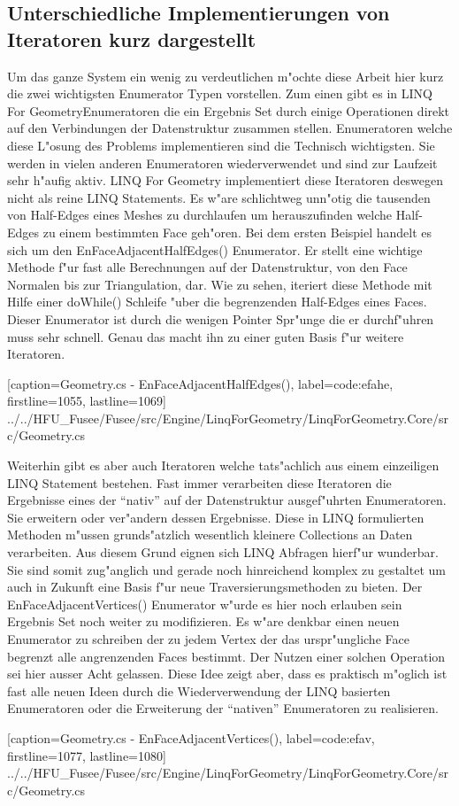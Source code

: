 \documentclass[pagesize, paper=a4, fontsize=12pt,titlepage=true, headings=small, headnosepline, abstractoff, liststotoc, nochapterprefix, plainheadsepline]{scrreprt}
\newcommand{\LFG}{LINQ For Geometry}
\newcommand{\LFGS}{LINQ For Geometry }
\begin{document}
		\subsection {Unterschiedliche Implementierungen von Iteratoren kurz dargestellt}
			Um das ganze System ein wenig zu verdeutlichen m"ochte diese Arbeit hier kurz die zwei wichtigsten Enumerator Typen vorstellen. Zum einen gibt es in \LFG Enumeratoren die ein Ergebnis Set durch einige Operationen direkt auf den Verbindungen der Datenstruktur zusammen stellen. Enumeratoren welche diese L"osung des Problems implementieren sind die Technisch wichtigsten. Sie werden in vielen anderen Enumeratoren wiederverwendet und sind zur Laufzeit sehr h"aufig aktiv. \LFGS implementiert diese Iteratoren deswegen nicht als reine LINQ Statements. Es w"are schlichtweg unn"otig die tausenden von Half-Edges eines Meshes zu durchlaufen um herauszufinden welche Half-Edges zu einem bestimmten Face geh"oren. Bei dem ersten Beispiel handelt es sich um den EnFaceAdjacentHalfEdges() Enumerator. Er stellt eine wichtige Methode f"ur fast alle Berechnungen auf der Datenstruktur, von den Face Normalen bis zur Triangulation, dar. Wie zu sehen, iteriert diese Methode mit Hilfe einer do{}While() Schleife "uber die begrenzenden Half-Edges eines Faces. Dieser Enumerator ist durch die wenigen Pointer Spr"unge die er durchf"uhren muss sehr schnell. Genau das macht ihn zu einer guten Basis f"ur weitere Iteratoren.


			[caption={Geometry.cs - EnFaceAdjacentHalfEdges()}, label=code:efahe, firstline=1055, lastline=1069]
			{../../HFU_Fusee/Fusee/src/Engine/LinqForGeometry/LinqForGeometry.Core/src/Geometry.cs}

Weiterhin gibt es aber auch Iteratoren welche tats"achlich aus einem einzeiligen LINQ Statement bestehen. Fast immer verarbeiten diese Iteratoren die Ergebnisse eines der "`nativ"' auf der Datenstruktur ausgef"uhrten Enumeratoren. Sie erweitern oder ver"andern dessen Ergebnisse. Diese in LINQ formulierten Methoden m"ussen grunds"atzlich wesentlich kleinere Collections an Daten verarbeiten. Aus diesem Grund eignen sich LINQ Abfragen hierf"ur wunderbar. Sie sind somit zug"anglich und gerade noch hinreichend komplex zu gestaltet um auch in Zukunft eine Basis f"ur neue Traversierungsmethoden zu bieten.
Der EnFaceAdjacentVertices() Enumerator w"urde es hier noch erlauben sein Ergebnis Set noch weiter zu modifizieren. Es w"are denkbar einen neuen Enumerator zu schreiben der zu jedem Vertex der das urspr"ungliche Face begrenzt alle angrenzenden Faces bestimmt. Der Nutzen einer solchen Operation sei hier ausser Acht gelassen. Diese Idee zeigt aber, dass es praktisch m"oglich ist fast alle neuen Ideen durch die Wiederverwendung der LINQ basierten Enumeratoren oder die Erweiterung der "`nativen"' Enumeratoren zu realisieren.

			[caption={Geometry.cs - EnFaceAdjacentVertices()}, label=code:efav, firstline=1077, lastline=1080]
			{../../HFU_Fusee/Fusee/src/Engine/LinqForGeometry/LinqForGeometry.Core/src/Geometry.cs}
\end{document}
